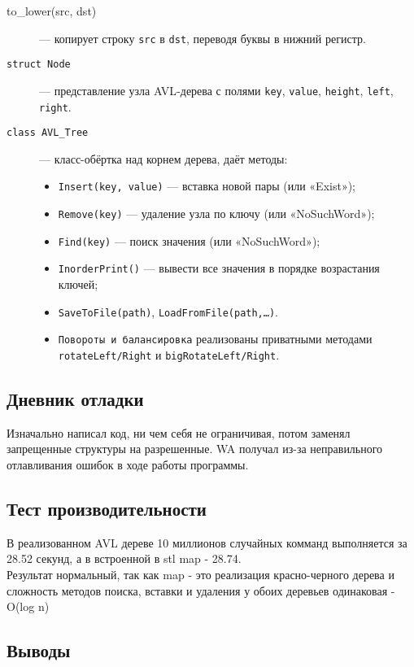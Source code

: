 \documentclass[12pt]{article}
\begin{document}
  \begin{description}
    \item[{to\_lower(src, dst)}] --- копирует строку \texttt{src} в \texttt{dst}, переводя буквы в нижний регистр.
    \item[\texttt{struct Node}] --- представление узла AVL‑дерева с полями \texttt{key}, \texttt{value}, \texttt{height}, \texttt{left}, \texttt{right}.
    \item[\texttt{class AVL\_Tree}] --- класс-обёртка над корнем дерева, даёт методы:
      \begin{itemize}
        \item \texttt{Insert(key, value)} --- вставка новой пары (или «Exist»);
        \item \texttt{Remove(key)} --- удаление узла по ключу (или «NoSuchWord»);
        \item \texttt{Find(key)} --- поиск значения (или «NoSuchWord»);
        \item \texttt{InorderPrint()} --- вывести все значения в порядке возрастания ключей;
        \item \texttt{SaveToFile(path)}, \texttt{LoadFromFile(path,\dots)}.
        \item \texttt{Повороты и балансировка} реализованы приватными методами \texttt{rotateLeft/Right} и \texttt{bigRotateLeft/Right}.
      \end{itemize}
    \end{description}

\subsection*{Дневник отладки}

Изначально написал код, ни чем себя не ограничивая, потом заменял запрещенные структуры на разрешенные. WA получал из-за неправильного отлавливания ошибок в ходе работы программы.

\subsection*{Тест производительности}

В реализованном AVL дереве 10 миллионов случайных комманд выполняется за 28.52 секунд, а в встроенной в stl map - 28.74.\\Результат нормальный, так как map - это реализация красно-черного дерева и сложность методов поиска, вставки и удаления у обоих деревьев одинаковая - O(log n)

\subsection*{Выводы}
\end{document}

